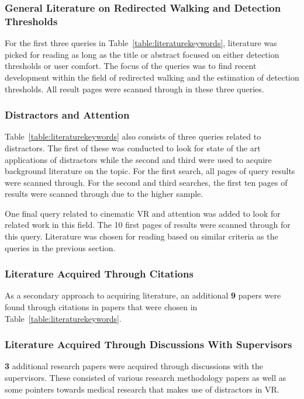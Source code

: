 \subsubsection{General Literature on Redirected Walking and Detection Thresholds}
For the first three queries in Table~\ref{table:literaturekeywords}, literature was picked for reading as long as the title or abstract focused on either detection thresholds or user comfort. The focus of the queries was to find recent development within the field of redirected walking and the estimation of detection thresholds. All result pages were scanned through in these three queries. 

\subsubsection{Distractors and Attention}
Table~\ref{table:literaturekeywords} also consists of three queries related to distractors. The first of these was conducted to look for state of the art applications of distractors while the second and third were used to acquire background literature on the topic. For the first search, all pages of query results were scanned through. For the second and third searches, the first ten pages of results were scanned through due to the higher sample. 

One final query related to cinematic VR and attention was added to look for related work in this field. The 10 first pages of results were scanned through for this query.
Literature was chosen for reading based on similar criteria as the queries in the previous section.

\subsubsection{Literature Acquired Through Citations}
As a secondary approach to acquiring literature, an additional \textbf{9} papers were found through citations in papers that were chosen in Table~\ref{table:literaturekeywords}. 

\subsubsection{Literature Acquired Through Discussions With Supervisors}
\textbf{3} additional research papers were acquired through discussions with the supervisors. These consisted of various research methodology papers as well as some pointers towards medical research that makes use of distractors in VR.

